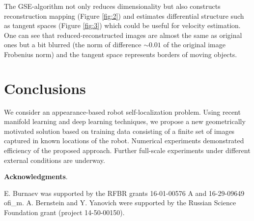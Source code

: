 \documentclass[conference]{IEEEtran} %
\begin{document}
The GSE-algorithm not only reduces dimensionality but also constructs reconstruction mapping (Figure \ref{fig:2}) and estimates differential structure such as tangent spaces (Figure \ref{fig:3}) which could be useful for velocity estimation. One can see that reduced-reconstructed images are almost the same as original ones but a bit blurred (the norm of difference $\sim 0.01$ of the original image Frobenius norm) and the tangent space represents borders of moving objects.

\section{Conclusions}
\label{sec6}

 We consider an appearance-based robot self-localization problem. Using recent manifold learning and deep learning techniques, we propose a new geometrically motivated solution based on training data consisting of a finite set of images captured in known locations of the robot. Numerical experiments demonstrated efficiency of the proposed approach. Further full-scale experiments under different external conditions are underway.

\vspace{1em}
\noindent\textbf{Acknowledgments}. 

E. Burnaev was supported by the RFBR grants 16-01-00576 A and 16-29-09649 ofi\_m. A. Bernstein and Y. Yanovich were supported by the Russian Science Foundation grant (project 14-50-00150).
\end{document}
